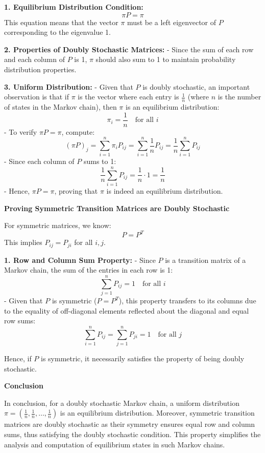 \documentclass[8pt]{article}
\begin{document}
\textbf{1. Equilibrium Distribution Condition:}
   \[
   \pi P = \pi
   \]
   This equation means that the vector \(\pi\) must be a left eigenvector of \(P\) corresponding to the eigenvalue 1.

\textbf{2. Properties of Doubly Stochastic Matrices:}
   - Since the sum of each row and each column of \(P\) is 1, \(\pi\) should also sum to 1 to maintain probability distribution properties. 

\textbf{3. Uniform Distribution:}
   - Given that \(P\) is doubly stochastic, an important observation is that if \(\pi\) is the vector where each entry is \(\frac{1}{n}\) (where \(n\) is the number of states in the Markov chain), then \(\pi\) is an equilibrium distribution:
     \[
     \pi_i = \frac{1}{n} \quad \text{for all } i
     \]
   - To verify \(\pi P = \pi\), compute:
     \[
     (\pi P)_j = \sum_{i=1}^n \pi_i P_{ij} = \sum_{i=1}^n \frac{1}{n} P_{ij} = \frac{1}{n} \sum_{i=1}^n P_{ij}
     \]
   - Since each column of \(P\) sums to 1:
     \[
     \frac{1}{n} \sum_{i=1}^n P_{ij} = \frac{1}{n} \cdot 1 = \frac{1}{n}
     \]
   - Hence, \(\pi P = \pi\), proving that \(\pi\) is indeed an equilibrium distribution.

\textbf{Proving Symmetric Transition Matrices are Doubly Stochastic}

For symmetric matrices, we know:
   \[
   P = P^T
   \]
This implies \(P_{ij} = P_{ji}\) for all \(i, j\).

\textbf{1. Row and Column Sum Property:}
   - Since \(P\) is a transition matrix of a Markov chain, the sum of the entries in each row is 1:
     \[
     \sum_{j=1}^n P_{ij} = 1 \quad \text{for all } i
     \]
   - Given that \(P\) is symmetric (\(P = P^T\)), this property transfers to its columns due to the equality of off-diagonal elements reflected about the diagonal and equal row sums:
     \[
     \sum_{i=1}^n P_{ij} = \sum_{j=1}^n P_{ji} = 1 \quad \text{for all } j
     \]

Hence, if \(P\) is symmetric, it necessarily satisfies the property of being doubly stochastic.

\textbf{Conclusion}

In conclusion, for a doubly stochastic Markov chain, a uniform distribution \(\pi = \left(\frac{1}{n}, \frac{1}{n}, \ldots, \frac{1}{n}\right)\) is an equilibrium distribution. Moreover, symmetric transition matrices are doubly stochastic as their symmetry ensures equal row and column sums, thus satisfying the doubly stochastic condition. This property simplifies the analysis and computation of equilibrium states in such Markov chains.
\end{document}
